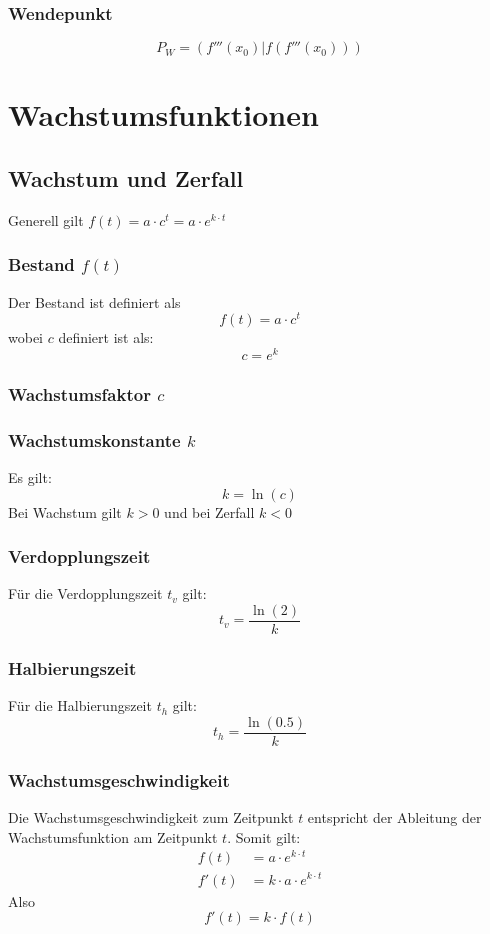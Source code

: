 \documentclass[a4paper,12pt]{article}
\begin{document}
\subsubsection{Wendepunkt}
$$P_{W} = (f'''(x_0) | f(f'''(x_0)))$$
\section{Wachstumsfunktionen}


\subsection{Wachstum und Zerfall}
Generell gilt $f(t) = a \cdot c^t = a \cdot e^{k \cdot t}$ 
\subsubsection{Bestand $f(t)$}
Der Bestand ist definiert als
$$f(t) = a \cdot c^t$$
wobei $c$ definiert ist als:
$$c = e^k$$
\subsubsection{Wachstumsfaktor $c$}
\subsubsection{Wachstumskonstante $k$}
Es gilt:
$$k = \ln{(c)}$$
Bei Wachstum gilt $k > 0$ und bei Zerfall $k < 0$
\subsubsection{Verdopplungszeit}
Für die Verdopplungszeit $t_v$ gilt:
$$t_v = \frac{\ln{(2)}}{k}$$
\subsubsection{Halbierungszeit}
Für die Halbierungszeit $t_h$ gilt:
$$t_h = \frac{\ln{(0.5)}}{k}$$
\subsubsection{Wachstumsgeschwindigkeit}
Die Wachstumsgeschwindigkeit zum Zeitpunkt $t$ entspricht der Ableitung der Wachstumsfunktion am Zeitpunkt $t$.
Somit gilt:
\begin{equation}
\begin{split}
f(t) & = a \cdot e^{k \cdot t}\\
f'(t) &= k \cdot a \cdot e^{k \cdot t}
\end{split}
\end{equation}
Also $$f'(t) = k \cdot f(t)$$
\pagebreak
\end{document}
